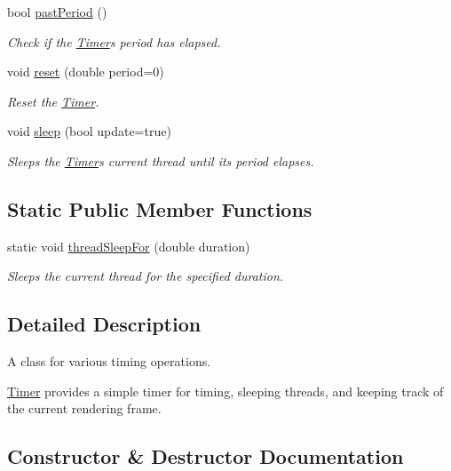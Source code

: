 \begin{DoxyCompactItemize}
bool \hyperlink{classtsgl_1_1_timer_ac7c908b06a735f09841367c7067f44dd}{past\+Period} ()
\begin{DoxyCompactList}\small\item\em Check if the \hyperlink{classtsgl_1_1_timer}{Timer}\textquotesingle{}s period has elapsed. \end{DoxyCompactList}\item 
void \hyperlink{classtsgl_1_1_timer_a67a01c03c033c52056b7f1c733cd93e4}{reset} (double period=0)
\begin{DoxyCompactList}\small\item\em Reset the \hyperlink{classtsgl_1_1_timer}{Timer}. \end{DoxyCompactList}\item 
void \hyperlink{classtsgl_1_1_timer_a5c6e0dca6793d48c675e05b983da7f07}{sleep} (bool update=true)
\begin{DoxyCompactList}\small\item\em Sleeps the \hyperlink{classtsgl_1_1_timer}{Timer}\textquotesingle{}s current thread until its period elapses. \end{DoxyCompactList}\end{DoxyCompactItemize}
\subsection*{Static Public Member Functions}
\begin{DoxyCompactItemize}
\item 
static void \hyperlink{classtsgl_1_1_timer_ae8c5b39a6c5cae2a24abe2a298b05b64}{thread\+Sleep\+For} (double duration)
\begin{DoxyCompactList}\small\item\em Sleeps the current thread for the specified duration. \end{DoxyCompactList}\end{DoxyCompactItemize}


\subsection{Detailed Description}
A class for various timing operations. 

\hyperlink{classtsgl_1_1_timer}{Timer} provides a simple timer for timing, sleeping threads, and keeping track of the current rendering frame. 

\subsection{Constructor \& Destructor Documentation}
\hypertarget{classtsgl_1_1_timer_abd022bb9ea6ddf5b69ff645ac8f5594d}{}
